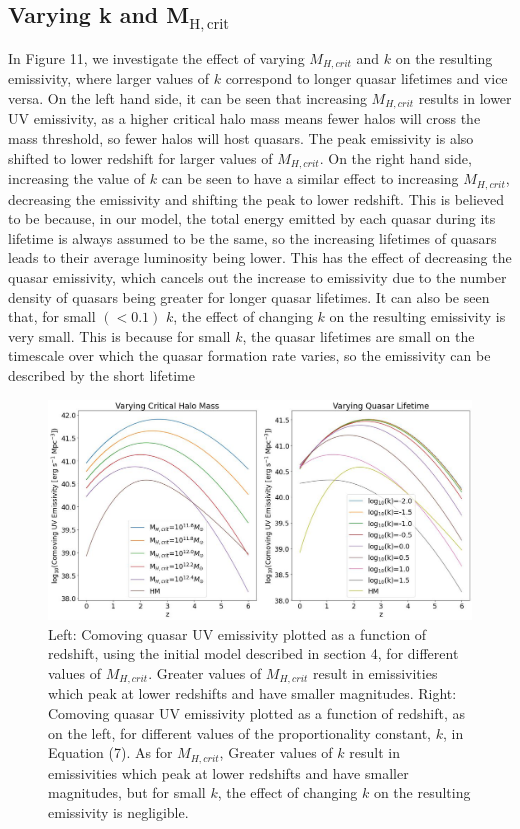 \documentclass[12pt]{article}%
\begin{document}
\subsection{Varying k and M$_{\mathrm{H,crit}}$}

In Figure 11, we investigate the effect of varying $M_{H,crit}$ and $k$ on the resulting emissivity, where larger values of $k$ correspond to longer quasar lifetimes and vice versa. On the left hand side, it can be seen that increasing $M_{H,crit}$ results in lower UV emissivity, as a higher critical halo mass means fewer halos will cross the mass threshold, so fewer halos will host quasars. The peak emissivity is also shifted to lower redshift for larger values of $M_{H,crit}$. On the right hand side, increasing the value of $k$ can be seen to have a similar effect to increasing $M_{H,crit}$, decreasing the emissivity and shifting the peak to lower redshift. This is believed to be because, in our model, the total energy emitted by each quasar during its lifetime is always assumed to be the same, so the increasing lifetimes of quasars leads to their average luminosity being lower. This has the effect of decreasing the quasar emissivity, which cancels out the increase to emissivity due to the number density of quasars being greater for longer quasar lifetimes. It can also be seen that, for small $(<0.1)$ $k$, the effect of changing $k$ on the resulting emissivity is very small. This is because for small $k$, the quasar lifetimes are small on the timescale over which the quasar formation rate varies, so the emissivity can be described by the short lifetime

\onecolumngrid


 \begin{figure}[H]
     \centering
     \includegraphics[width=\linewidth]{Plot_9.jpeg}
     \caption{Left: Comoving quasar UV emissivity plotted as a function of redshift, using the initial model described in section 4, for different values of $M_{H,crit}$. Greater values of $M_{H,crit}$ result in emissivities which peak at lower redshifts and have smaller magnitudes. Right: Comoving quasar UV emissivity plotted as a function of redshift, as on the left, for different values of the proportionality constant, $k$, in Equation (7). As for $M_{H,crit}$, Greater values of $k$ result in emissivities which peak at lower redshifts and have smaller magnitudes, but for small $k$, the effect of changing $k$ on the resulting emissivity is negligible.}
     \label{fig:11}
 \end{figure}
\end{document}
